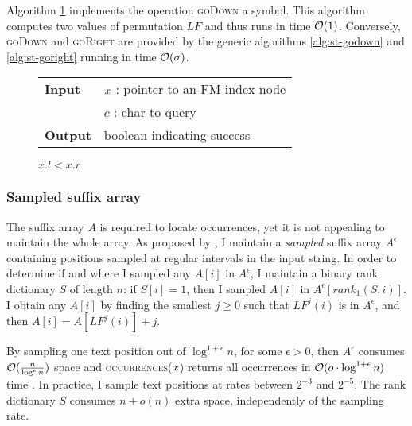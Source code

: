 Algorithm \ref{alg:fm-godownc} implements the operation \textsc{goDown} a symbol.
This algorithm computes two values of permutation $LF$ and thus runs in time $\mathcal{O}(1)$.
Conversely, \textsc{goDown} and \textsc{goRight} are provided by the generic algorithms \ref{alg:st-godown} and \ref{alg:st-goright} running in time $\mathcal{O}(\sigma)$.


\begin{figure*}
\begin{center}
\begin{minipage}[t]{.5\textwidth}
\begin{algorithm}[H]
\begin{tabular}{ll}
\textbf{Input}  & $x$ : pointer to an FM-index node\\
				& $c$ : char to query\\
\textbf{Output} & boolean indicating success\\
\end{tabular}
\begin{algorithmic}[1]
	\State \Return \False
\EndIf
{}
\State \Return $x.l < x.r$
\end{algorithmic}
\label{alg:fm-godownc}
\end{algorithm}
\end{minipage}
\end{center}
\end{figure*}

\subsubsection{Sampled suffix array}

The suffix array $A$ is required to locate occurrences, yet it is not appealing to maintain the whole array.
As proposed by \cite{Ferragina2000}, I maintain a \emph{sampled} suffix array $A^{\epsilon}$ containing positions sampled at regular intervals in the input string.
In order to determine if and where I sampled any $A[i]$ in $A^{\epsilon}$, I maintain a binary rank dictionary $S$ of length $n$: if $S[i]=1$, then I sampled $A[i]$ in $A^{\epsilon}[rank_1(S,i)]$.
I obtain any $A[i]$ by finding the smallest $j \geq 0$ such that $LF^j(i)$ is in $A^{\epsilon}$, and then $A[i] = A[LF^j(i)] + j$.

By sampling one text position out of $\log^{1+\epsilon}{n}$, for some $\epsilon > 0$, then $A^{\epsilon}$ consumes $\mathcal{O}(\frac{n}{\log^{\epsilon}{n}})$ space and \textsc{occurrences}($x$) returns all occurrences in $\mathcal{O}(o \cdot \log^{1+\epsilon}{n})$ time \citep{Ferragina2000}.
In practice, I sample text positions at rates between $2^{-3}$ and $2^{-5}$.
The rank dictionary $S$ consumes $n+o(n)$ extra space, independently of the sampling rate.

